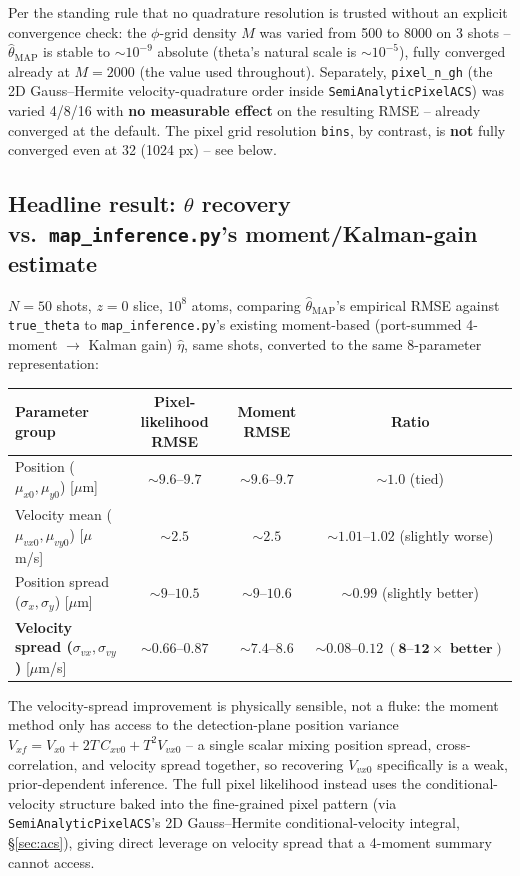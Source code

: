 \documentclass[11pt,a4paper]{article}
\newcommand{\code}[1]{\texttt{#1}}
\begin{document}
Per the standing rule that no quadrature resolution is trusted without an
explicit convergence check: the $\phi$-grid density $M$ was varied from 500
to 8000 on 3 shots -- $\hat\theta_{\mathrm{MAP}}$ is stable to
$\sim10^{-9}$ absolute (theta's natural scale is $\sim10^{-5}$), fully
converged already at $M=2000$ (the value used throughout). Separately,
\code{pixel\_n\_gh} (the 2D Gauss--Hermite velocity-quadrature order inside
\code{SemiAnalyticPixelACS}) was varied 4/8/16 with \textbf{no measurable
effect} on the resulting RMSE -- already converged at the default. The
pixel grid resolution \code{bins}, by contrast, is \textbf{not} fully
converged even at 32 (1024 px) -- see below.

\subsection{Headline result: $\theta$ recovery vs.\ \code{map\_inference.py}'s
moment/Kalman-gain estimate}
\label{sec:2026-07-20-headline}

$N=50$ shots, $z{=}0$ slice, $10^8$ atoms, comparing $\hat\theta_{\mathrm{MAP}}$'s
empirical RMSE against \code{true\_theta} to \code{map\_inference.py}'s
existing moment-based (port-summed 4-moment $\to$ Kalman gain) $\hat\eta$,
same shots, converted to the same 8-parameter representation:

\begin{center}
\begin{tabular}{lccc}
\toprule
Parameter group & Pixel-likelihood RMSE & Moment RMSE & Ratio \\
\midrule
Position ($\mu_{x0},\mu_{y0}$) [$\mu$m]        & $\sim9.6$--$9.7$ & $\sim9.6$--$9.7$ & $\sim1.0$ (tied) \\
Velocity mean ($\mu_{vx0},\mu_{vy0}$) [$\mu$m/s] & $\sim2.5$        & $\sim2.5$        & $\sim1.01$--$1.02$ (slightly worse) \\
Position spread ($\sigma_x,\sigma_y$) [$\mu$m] & $\sim9$--$10.5$  & $\sim9$--$10.6$  & $\sim0.99$ (slightly better) \\
\textbf{Velocity spread ($\sigma_{vx},\sigma_{vy}$)} [$\mu$m/s] & $\mathbf{\sim0.66\text{--}0.87}$ & $\mathbf{\sim7.4\text{--}8.6}$ & $\mathbf{\sim0.08\text{--}0.12\ (8\text{--}12\times\text{ better})}$ \\
\bottomrule
\end{tabular}
\end{center}

The velocity-spread improvement is physically sensible, not a fluke: the
moment method only has access to the detection-plane position variance
$V_{xf}=V_{x0}+2T\,C_{xv0}+T^2 V_{vx0}$ -- a single scalar mixing position
spread, cross-correlation, and velocity spread together, so recovering
$V_{vx0}$ specifically is a weak, prior-dependent inference. The full pixel
likelihood instead uses the conditional-velocity structure baked into the
fine-grained pixel pattern (via \code{SemiAnalyticPixelACS}'s 2D
Gauss--Hermite conditional-velocity integral, \S\ref{sec:acs}), giving
direct leverage on velocity spread that a 4-moment summary cannot access.
\end{document}
